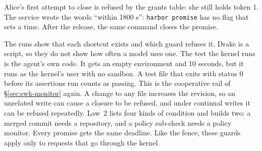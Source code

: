 
Alice's first attempt to close is refused by the grants table: she still
holds token 1. The service wrote the words ``within 1800 s'':
\mbox{\texttt{harbor promise}} has no flag that sets a time. After the
release, the same command closes the promise.

\begin{pdboundary}
\setlength{\parskip}{4pt plus 1pt}
The runs show that each shortcut exists and which guard refuses it. Drake
is a script, so they do not show how often a model uses one. The test the
kernel runs is the agent's own code. It gets an empty environment and 10
seconds, but it runs as the kernel's user with no sandbox. A test file that
exits with status 0 before its assertions run counts as passing. This is
the cooperative rail of \S\ref{sec:swk-monitor} again. A change to any file
increases the revision, so an unrelated write can cause a closure to be
refused, and under continual writes it can be refused repeatedly. Law~2
lists four kinds of condition and \pdkernelname{} builds two: a merged
commit needs a repository, and a policy sub-check needs a policy monitor.
Every promise gets the same deadline. Like the fence, these guards apply
only to requests that go through the kernel.
\end{pdboundary}

